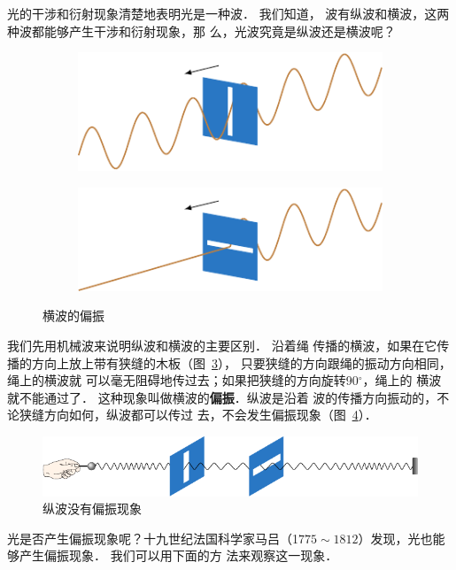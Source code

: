 光的干涉和衍射现象清楚地表明光是一种波．
我们知道，
波有纵波和横波，这两种波都能够产生干涉和衍射现象，那
么，光波究竟是纵波还是横波呢？
\begin{figure}[htbp]
    \centering
    \begin{subfigure}{0.45\linewidth}
        \centering
        \includegraphics{fig/C/6-11a.pdf}
        \caption{}\label{fig_C_6-11a}
    \end{subfigure}
    \hfil
    \begin{subfigure}{0.45\linewidth}
        \centering
        \includegraphics{fig/C/6-11b.pdf}
        \caption{}\label{fig_C_6-11b}
    \end{subfigure}
    \caption{横波的偏振}\label{fig_C_6-11}
\end{figure}

我们先用机械波来说明纵波和横波的主要区别．
沿着绳
传播的横波，如果在它传播的方向上放上带有狭缝的木板（图~\ref{fig_C_6-11}），
只要狭缝的方向跟绳的振动方向相同，绳上的横波就
可以毫无阻碍地传过去；如果把狭缝的方向旋转90$^\circ$，绳上的
横波就不能通过了．
这种现象叫做横波的\textbf{偏振}．纵波是沿着
波的传播方向振动的，不论狭缝方向如何，纵波都可以传过
去，不会发生偏振现象（图~\ref{fig_C_6-12}）．
\begin{figure}[htbp]
    \centering
    \includegraphics{fig/C/6-12.pdf}
    \caption{纵波没有偏振现象}\label{fig_C_6-12}
\end{figure}

光是否产生偏振现象呢？十九世纪法国科学家马吕（1$775 \sim 1812$）发现，光也能够产生偏振现象．
我们可以用下面的方
法来观察这一现象．

